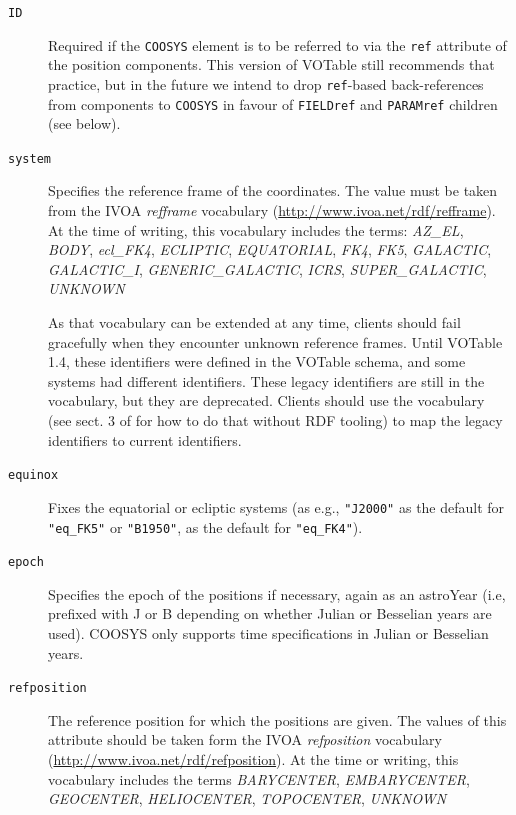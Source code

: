 \documentclass[11pt,a4paper]{ivoa}
\let\fg=\color
\def\attr#1{{\tt{\fg{DarkRed}#1}}}
\def\elem#1{{\tt{\fg{DarkRed}#1}}}
\begin{document}
\begin{description}
\item[\attr{ID}] Required if the \elem{COOSYS} element is to
be referred to via the \attr{ref} attribute of the position components.
This version of VOTable still recommends that practice, but in the
future we intend to drop \attr{ref}-based back-references from
components to \elem{COOSYS} in favour of \elem{FIELDref} and
\elem{PARAMref} children (see below).

\item[\attr{system}] Specifies the reference frame of the coordinates.
The value must be taken from the IVOA \emph{refframe} vocabulary
(\url{http://www.ivoa.net/rdf/refframe}).  At the time of writing, this
vocabulary includes the terms:
\textsl{AZ\_EL},
\textsl{BODY},
\textsl{ecl\_FK4},
\textsl{ECLIPTIC},
\textsl{EQUATORIAL},
\textsl{FK4},
\textsl{FK5},
\textsl{GALACTIC},
\textsl{GALACTIC\_I},
\textsl{GENERIC\_GALACTIC},
\textsl{ICRS},
\textsl{SUPER\_GALACTIC},
\textsl{UNKNOWN}

As that vocabulary can be extended at any time, clients should fail
gracefully when they encounter unknown reference frames.  Until VOTable
1.4, these identifiers were defined in the VOTable schema, and some
systems had different identifiers.  These legacy identifiers are still
in the vocabulary, but they are deprecated.  Clients should use the
vocabulary (see sect. 3 of \citet{2023ivoa.spec.0206D} for how to do
that without RDF tooling) to map the legacy identifiers to current
identifiers.

\item[\attr{equinox}] Fixes the
equatorial or ecliptic systems (as e.g., \verb|"J2000"| as the default
for \verb|"eq_FK5"| or \verb|"B1950"|, as the default for
\verb|"eq_FK4"|).

\item[\attr{epoch}] Specifies the epoch of the positions
if necessary, again as an astroYear (i.e, prefixed with J or B depending
on whether Julian or Besselian years are used).  COOSYS only supports time
specifications in Julian or Besselian years.

\item[\attr{refposition}] The reference position for which the positions
are given.  The values of this attribute should be taken form the IVOA
\emph{refposition} vocabulary (\url{http://www.ivoa.net/rdf/refposition}).
At the time or writing, this vocabulary includes the terms
\textsl{BARYCENTER},
\textsl{EMBARYCENTER},
\textsl{GEOCENTER},
\textsl{HELIOCENTER},
\textsl{TOPOCENTER},
\textsl{UNKNOWN}
\end{description}
\end{document}
